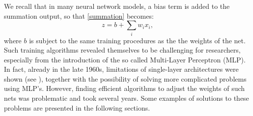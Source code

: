 \documentclass[%
    corpo=11pt,
    twoside,
    stile=classica,
    oldstyle,
    autoretitolo,
    tipotesi=magistrale,
    greek,
    evenboxes,
    english
]{toptesi}
\begin{document}
We recall that in many neural network models, a bias term is added to the summation output, so that \eqref{summation} becomes:
\begin{equation}
z = b + \sum_{i}w_i x_i,
\end{equation}
where $b$ is subject to the same training procedures as the the weights of the net. \\ Such training algorithms revealed themselves to be challenging for researchers, especially from the introduction of the so called Multi-Layer Perceptron (MLP). In fact, already in the late 1960s, limitations of single-layer architectures were shown (see \cite{minpapert}), together with the possibility of solving more complicated problems using MLP's. However, finding efficient algorithms to adjust the weights of such nets was problematic and took several years. Some examples of solutions to these problems are presented in the following sections.
\end{document}
